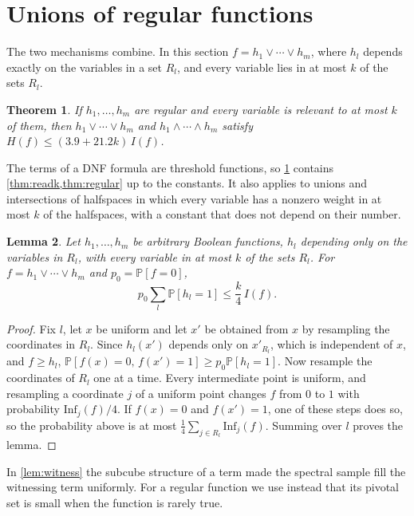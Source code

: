 \documentclass[11pt]{amsart}
\newtheorem{theorem}{Theorem}[section]
\newtheorem{lemma}[theorem]{Lemma}
\theoremstyle{definition}
\theoremstyle{remark}
\renewcommand{\Pr}{\mathbb{P}}
\newcommand{\Inf}{\mathrm{Inf}}
\begin{document}
\section{Unions of regular functions}\label{sec:union}

The two mechanisms combine. In this section $f=h_1\vee\cdots\vee h_m$, where $h_l$ depends exactly on the variables
in a set $R_l$, and every variable lies in at most $k$ of the sets $R_l$.

\begin{theorem}\label{thm:union}
If $h_1,\dots,h_m$ are regular and every variable is relevant to at most $k$ of them, then $h_1\vee\cdots\vee h_m$
and $h_1\wedge\cdots\wedge h_m$ satisfy $H(f)\le(3.9+21.2k)\,I(f)$.
\end{theorem}

The terms of a DNF formula are threshold functions, so \cref{thm:union} contains \cref{thm:readk,thm:regular} up to
the constants. It also applies to unions and intersections of halfspaces in which every variable has a nonzero
weight in at most $k$ of the halfspaces, with a constant that does not depend on their number.

\begin{lemma}\label{lem:upath}
Let $h_1,\dots,h_m$ be arbitrary Boolean functions, $h_l$ depending only on the variables in $R_l$, with every
variable in at most $k$ of the sets $R_l$. For $f=h_1\vee\cdots\vee h_m$ and $p_0=\Pr[f=0]$,
\[
p_0\sum_l\Pr[h_l=1]\le\frac k4\,I(f).
\]
\end{lemma}

\begin{proof}
Fix $l$, let $x$ be uniform and let $x'$ be obtained from $x$ by resampling the coordinates in $R_l$. Since
$h_l(x')$ depends only on $x'_{R_l}$, which is independent of $x$, and $f\ge h_l$,
$\Pr[f(x)=0,\,f(x')=1]\ge p_0\Pr[h_l=1]$. Now resample the coordinates of $R_l$ one at a time. Every intermediate
point is uniform, and resampling a coordinate $j$ of a uniform point changes $f$ from $0$ to $1$ with probability
$\Inf_j(f)/4$. If $f(x)=0$ and $f(x')=1$, one of these steps does so, so the probability above is at most
$\frac14\sum_{j\in R_l}\Inf_j(f)$. Summing over $l$ proves the lemma.
\end{proof}

In \cref{lem:witness} the subcube structure of a term made the spectral sample fill the witnessing term uniformly.
For a regular function we use instead that its pivotal set is small when the function is rarely true.
\end{document}
